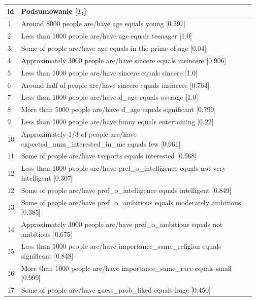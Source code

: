 \documentclass{classrep}
\begin{document}
\begin{center}
  \begin{table}[H]
    \begin{tabularx}{\textwidth}{lXc}
    
    id & Podsumowanie [$T_1$] \\ \hline 
  
    1 & Around 8000 people are/have age equals young [0.397] \\ \hline
    2 & Less than 1000 people are/have age equals teenager [1.0]\\ \hline
    3 & Some of people are/have age equals in the prime of age [0.04] \\ \hline
    4 & Approximately 3000 people are/have sincere equals insincere [0.906] \\ \hline
    5 & Less than 1000 people are/have sincere equals sincere [1.0] \\ \hline
    6 & Around half of people are/have sincere equals insincere [0.764]\\ \hline
    7 & Less than 1000 people are/have d\_age equals average [1.0] \\ \hline 
    8 & More than 5000 people are/have d\_age equals significant [0.799]\\ \hline 
    9 & Less than 1000 people are/have funny equals entertaining [0.22]\\ \hline 
    10 & Approximately 1/3 of people are/have expected\_num\_interested\_in\_me equals few [0.961] \\ \hline
    11 & Some of people are/have tvsports equals interested [0.568] \\ \hline
    12 & Less than 1000 people are/have pref\_o\_intelligence equals not very intelligent [0.307]\\ \hline
    12 & Some of people are/have pref\_o\_intelligence equals intelligent [0.849] \\ \hline
    13 & Some of people are/have pref\_o\_ambitious equals moderately ambitious [0.385] \\ \hline
    14 & Approximately 3000 people are/have pref\_o\_ambitious equals not ambitious [0.675]\\ \hline
    15 & Less than 1000 people are/have importance\_same\_religion equals significant [0.848] \\ \hline
    16 & More than 1000 people are/have importance\_same\_race equals small [0.999] \\ \hline
    17 & Some of people are/have guess\_prob\_liked equals huge [0.450] \\ \hline

\end{tabularx}
\end{table}
\end{center}
\end{document}
